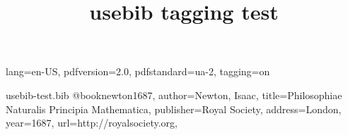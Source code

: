 \ifdefined\Uchar\RequirePackage{luatagging}\fi
\DocumentMetadata
  {
    lang=en-US,
    pdfversion=2.0,
    pdfstandard=ua-2,
    tagging=on
  }
\begin{filecontents}{usebib-test.bib}
@book{newton1687,
author={Newton, Isaac},
title={Philosophiae Naturalis Principia Mathematica},
publisher={Royal Society},
address={London},
year={1687},
url={http://royalsociety.org},
}
\end{filecontents}
\documentclass{article}

\usepackage{hyperref}
\usepackage{usebib}

\title{usebib tagging test}




\cite{newton1687} published by the  of . See .




